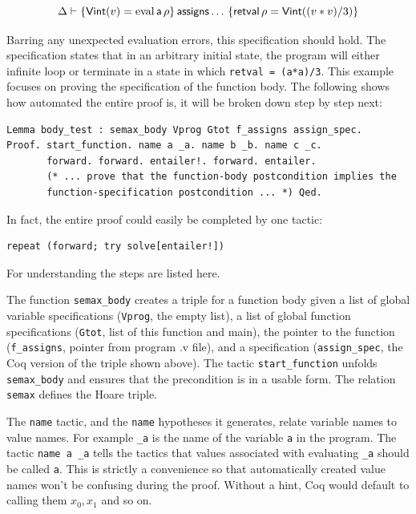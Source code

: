 \documentclass{puthesis}
\begin{document}
\[\Delta \vdash \{\mathsf{Vint}(v)=\mathrm{eval}\,\mathsf{a}\,\rho\}\,\mathsf{assigns}\ldots\,\{\mathsf{retval}\,\rho = \mathsf{Vint}((v * v) /
3)\}\]

Barring any unexpected evaluation errors, this specification should hold.
The specification states that in an arbitrary initial state, the program will either
infinite loop or terminate in a state in which \lstinline|retval = (a*a)/3|. This
example focuses on proving the specification of the function
body. The following shows
how automated the entire proof is, it will be broken down step by step
next:

\begin{lstlisting}
Lemma body_test : semax_body Vprog Gtot f_assigns assign_spec.
Proof. start_function. name a _a. name b _b. name c _c.
       forward. forward. entailer!. forward. entailer. 
       (* ... prove that the function-body postcondition implies the
       function-specification postcondition ... *) Qed.
\end{lstlisting}

In fact, the entire proof could easily be completed by one tactic:

\begin{lstlisting}
repeat (forward; try solve[entailer!])
\end{lstlisting}

For understanding the steps are listed here.

The function \lstinline|semax_body| creates a triple for a function body given a
list of global variable specifications (\lstinline|Vprog|, the empty list), a
list of global function specifications (\lstinline|Gtot|, list of this function and
main), the pointer to the function (\lstinline|f_assigns|, pointer from
program .v file), and a specification (\lstinline|assign_spec|, the Coq version
of the triple shown above). The tactic \lstinline|start_function| unfolds
\lstinline|semax_body| and ensures that the precondition is in a usable form.
The relation \lstinline|semax| defines the Hoare triple.

The \lstinline|name| tactic, and the \lstinline|name| hypotheses it
generates, relate variable names to value names. For example
\lstinline|_a| is the name of the variable \lstinline|a| in the
program. The tactic \lstinline|name a _a| tells the tactics that
values associated with evaluating \lstinline|_a| should be called
\lstinline|a|. This is strictly a convenience so that automatically
created value names won't be confusing during the proof. Without a
hint, Coq would default to calling them $x_0, x_1$ and so on. 
\end{document}

